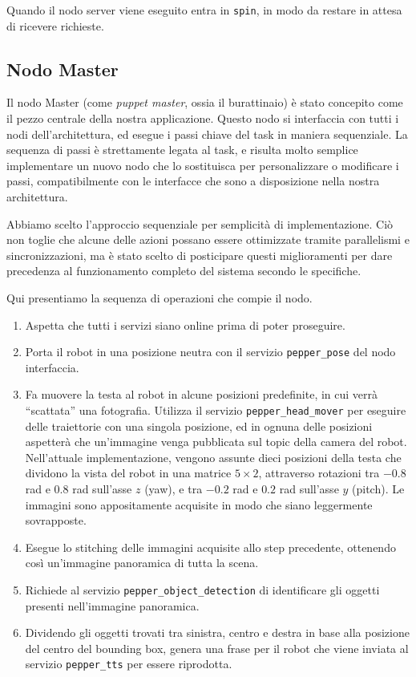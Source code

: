 Quando il nodo server viene eseguito entra in \verb|spin|, in modo da restare in attesa di ricevere richieste.

\subsection{Nodo Master}

Il nodo Master (come \emph{puppet master}, ossia il burattinaio) è stato concepito come il pezzo centrale della nostra applicazione. Questo nodo si interfaccia con tutti i nodi dell'architettura, ed esegue i passi chiave del task in maniera sequenziale. La sequenza di passi è strettamente legata al task, e risulta molto semplice implementare un nuovo nodo che lo sostituisca per personalizzare o modificare i passi, compatibilmente con le interfacce che sono a disposizione nella nostra architettura.

Abbiamo scelto l'approccio sequenziale per semplicità di implementazione. Ciò non toglie che alcune delle azioni possano essere ottimizzate tramite parallelismi e sincronizzazioni, ma è stato scelto di posticipare questi miglioramenti per dare precedenza al funzionamento completo del sistema secondo le specifiche.

Qui presentiamo la sequenza di operazioni che compie il nodo.
\begin{enumerate}
	\item Aspetta che tutti i servizi siano online prima di poter proseguire.
	\item Porta il robot in una posizione neutra con il servizio \verb|pepper_pose| del nodo interfaccia. 
	\item Fa muovere la testa al robot in alcune posizioni predefinite, in cui verrà ``scattata'' una fotografia. Utilizza il servizio \verb|pepper_head_mover| per eseguire delle traiettorie con una singola posizione, ed in ognuna delle posizioni aspetterà che un'immagine venga pubblicata sul topic della camera del robot. Nell'attuale implementazione, vengono assunte dieci posizioni della testa che dividono la vista del robot in una matrice $5 \times 2$, attraverso rotazioni tra $-0.8$ rad e $0.8$ rad sull'asse $z$ (yaw), e tra $-0.2$ rad e $0.2$ rad sull'asse $y$ (pitch). Le immagini sono appositamente acquisite in modo che siano leggermente sovrapposte.
	\item Esegue lo stitching delle immagini acquisite allo step precedente, ottenendo così un'immagine panoramica di tutta la scena.
	\item Richiede al servizio \verb|pepper_object_detection| di identificare gli oggetti presenti nell'immagine panoramica.
	\item Dividendo gli oggetti trovati tra sinistra, centro e destra in base alla posizione del centro del bounding box, genera una frase per il robot che viene inviata al servizio \verb|pepper_tts| per essere riprodotta.
\end{enumerate}

